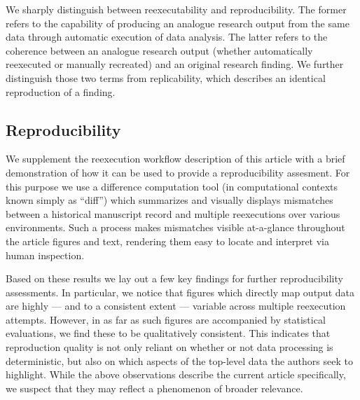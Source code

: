 We sharply distinguish between reexecutability and reproducibility.
The former refers to the capability of producing an analogue research output from the same data through automatic execution of data analysis.
The latter refers to the coherence between an analogue research output (whether automatically reexecuted or manually recreated) and an original research finding.
We further distinguish those two terms from replicability, which describes an identical reproduction of a finding.

\subsection{Reproducibility}


We supplement the reexecution workflow description of this article with a brief demonstration of how it can be used to provide a reproducibility assesment.
For this purpose we use a difference computation tool (in computational contexts known simply as “diff”) which summarizes and visually displays mismatches between a historical manuscript record and multiple reexecutions over various environments.
Such a process makes mismatches visible at-a-glance throughout the article figures and text, rendering them easy to locate and interpret via human inspection.

Based on these results we lay out a few key findings for further reproducibility assessments.
In particular, we notice that figures which directly map output data are highly — and to a consistent extent — variable across multiple reexecution attempts.
However, in as far as such figures are accompanied by statistical evaluations, we find these to be qualitatively consistent.
This indicates that reproduction quality is not only reliant on whether or not data processing is deterministic, but also on which aspects of the top-level data the authors seek to highlight.
While the above observations describe the current article specifically, we suspect that they may reflect a phenomenon of broader relevance.

